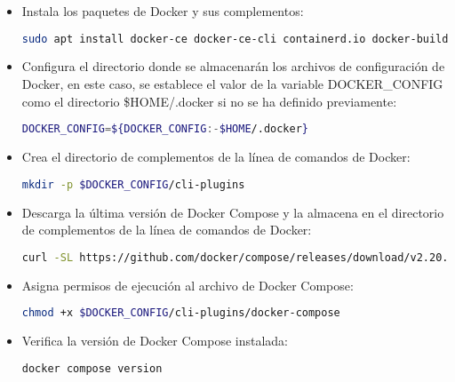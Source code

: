 \begin{itemize}
		\item Instala los paquetes de Docker y sus complementos:
			\begin{lstlisting}[language=Bash, caption=docker]
			sudo apt install docker-ce docker-ce-cli containerd.io docker-buildx-plugin docker-compose-plugin
			\end{lstlisting}
	
		\item Configura el directorio donde se almacenarán los archivos de configuración de Docker, en este caso, se establece el valor de la variable DOCKER\_CONFIG como el directorio \$HOME/.docker si no se ha definido previamente:
	
			\begin{lstlisting}[language=Bash, caption=docker]
			DOCKER_CONFIG=${DOCKER_CONFIG:-$HOME/.docker}
			\end{lstlisting}
		
		\item Crea el directorio de complementos de la línea de comandos de Docker:
			\begin{lstlisting}[language=Bash, caption=docker]
			mkdir -p $DOCKER_CONFIG/cli-plugins
			\end{lstlisting}
		
		\item Descarga la última versión de Docker Compose y la almacena en el directorio de complementos de la línea de comandos de Docker:
		
			\begin{lstlisting}[language=Bash, caption=docker]
			curl -SL https://github.com/docker/compose/releases/download/v2.20.0/docker-compose-linux-x86_64 -o $DOCKER_CONFIG/cli-plugins/docker-compose
			\end{lstlisting}
	
		\item Asigna permisos de ejecución al archivo de Docker Compose:
			
			\begin{lstlisting}[language=Bash, caption=docker]
			chmod +x $DOCKER_CONFIG/cli-plugins/docker-compose
			\end{lstlisting}
		
		\item Verifica la versión de Docker Compose instalada:
			\begin{lstlisting}[language=Bash, caption=docker]
			docker compose version
			\end{lstlisting}

		\end{itemize}
		
